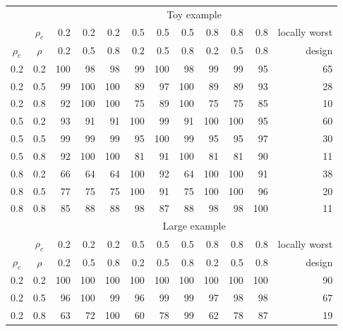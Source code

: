 \documentclass[12pt]{article}
\begin{document}
{\footnotesize
\vspace{.05in}
\begin{center}
\begin{tabular}{|cc|rrrrrrrrrr|}
\hline
&& \multicolumn{10}{c|}{Toy example}  \\
           & $\rho_{c}$ &  0.2 & 0.2 & 0.2 & 0.5 & 0.5 & 0.5 & 0.8 & 0.8 & 0.8 & locally worst \\
$\rho_{c}$ & $\rho$     &  0.2 & 0.5 & 0.8 & 0.2 & 0.5 & 0.8 & 0.2 & 0.5 & 0.8 & design \\
\hline
0.2 & 0.2 & 100 & 98  & 98  & 99  & 100 & 98  & 99  & 99  & 95  & 65  \\
0.2 & 0.5 & 99  & 100 & 100 & 89  & 97  & 100 & 89  & 89  & 93  & 28  \\
0.2 & 0.8 & 92  & 100 & 100 & 75  & 89  & 100 & 75  & 75  & 85  & 10  \\
0.5 & 0.2 & 93  & 91  & 91  & 100 & 99  & 91  & 100 & 100 & 95  & 60  \\
0.5 & 0.5 & 99  & 99  & 99  & 95  & 100 & 99  & 95  & 95  & 97  & 30  \\
0.5 & 0.8 & 92  & 100 & 100 & 81  & 91  & 100 & 81  & 81  & 90  & 11  \\
0.8 & 0.2 & 66  & 64  & 64  & 100 & 92  & 64  & 100 & 100 & 91  & 38  \\
0.8 & 0.5 & 77  & 75  & 75  & 100 & 91  & 75  & 100 & 100 & 96  & 20  \\
0.8 & 0.8 & 85  & 88  & 88  & 98  & 87  & 88  & 98  & 98  & 100 & 11  \\
\hline
&& \multicolumn{10}{c|}{Large example} \\
           & $\rho_{c}$ &  0.2 & 0.2 & 0.2 & 0.5 & 0.5 & 0.5 & 0.8 & 0.8 & 0.8 & locally worst \\
$\rho_{c}$ & $\rho$     &  0.2 & 0.5 & 0.8 & 0.2 & 0.5 & 0.8 & 0.2 & 0.5 & 0.8 & design \\
\hline
0.2 & 0.2 & 100 & 100 & 100 & 100 & 100 & 100 & 100 & 100 & 100 & 90 \\
0.2 & 0.5 & 96  & 100 & 99  & 96  & 99  & 99  & 97  & 98  & 98  & 67 \\
0.2 & 0.8 & 63  & 72  & 100 & 60  & 78  & 99  & 62  & 78  & 87  & 19 \\

\end{tabular}
\end{center}}
\end{document}
